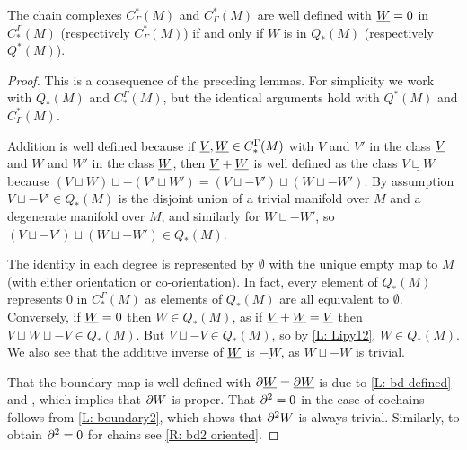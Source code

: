 \begin{lemma}\label{L: co/chains well defined}
The chain complexes $C_\Gamma^*(M)$ and $C_\Gamma^*(M)$ are well defined with $\underline{W}=0$ in $C^\Gamma_*(M)$ (respectively $C_\Gamma^*(M)$) if and only if $W$ is in $Q_*(M)$ (respectively $Q^*(M)$).
\end{lemma}
\begin{proof}
This is a consequence of the preceding lemmas. For simplicity we work with $Q_*(M)$ and $C^\Gamma_*(M)$, but the identical arguments hold with  $Q^*(M)$ and $C_\Gamma^*(M)$.

Addition is well defined because if $\underline{V},\underline{W}\in C^\Gamma_*(M)$ with $V$ and $V'$ in the class $\underline{V}$ and $W$ and $W'$ in the class $\underline{W}$, then $\underline{V}+\underline{W}$ is well defined as the class $\underline{V\sqcup W}$ because $(V\sqcup W)\sqcup -(V'\sqcup W')=(V\sqcup -V')\sqcup (W\sqcup -W')$: By assumption $V\sqcup -V'\in Q_*(M)$ is the disjoint union of a trivial manifold over $M$ and a degenerate manifold over $M$, and similarly for $W\sqcup -W'$, so $(V\sqcup -V')\sqcup (W\sqcup -W')\in Q_*(M)$.

The identity in each degree is represented by $\emptyset$ with the unique empty map to $M$ (with either orientation or co-orientation). In fact, every element of $Q_*(M)$  represents $0$ in $C^\Gamma_*(M)$ as elements of $Q_*(M)$ are all equivalent to $\emptyset$.
 Conversely, if $\underline{W}=0$ then $W\in Q_*(M)$, as  if $\underline{V}+\underline{W}=\underline{V}$ then $V\sqcup W \sqcup -V\in Q_*(M)$. But $V\sqcup -V\in Q_*(M)$, so by \cref{L: Lipy12}, $W\in Q_*(M)$.
We also see that the additive inverse of $\underline{W}$ is $\underline{-W}$, as $W\sqcup -W$ is trivial.


That the boundary map is well defined with $\partial \underline{W}=\underline{\partial W}$ is due to \cref{L: bd defined} and \cite[Lemma 2.8]{Joy12}, which implies that $\partial W$ is proper.
That $\partial^2=0$ in the case of cochains follows from  \cref{L: boundary2}, which shows that $\partial^2 W$ is always trivial. Similarly, to obtain $\partial^2=0$ for chains see \cref{R: bd2 oriented}.
\end{proof}

